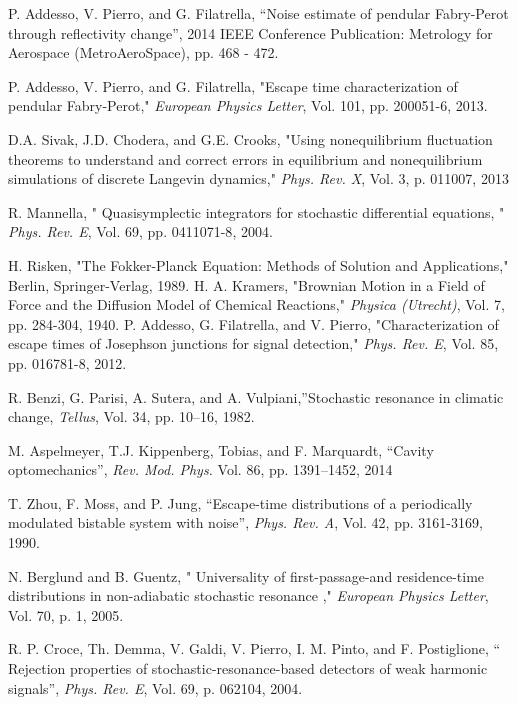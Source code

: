 \documentclass[conference]{IEEEtran}
\begin{document}
\begin{thebibliography}{99}
 P. Addesso, V. Pierro, and G. Filatrella, ``Noise estimate of pendular Fabry-Perot through reflectivity change'', 2014 IEEE Conference Publication: Metrology for Aerospace (MetroAeroSpace),  pp. 468 - 472.



P. Addesso, V. Pierro, and G. Filatrella, "Escape time characterization of pendular Fabry-Perot," {\it European Physics Letter}, {Vol. 101}, 
 pp. 200051-6, 2013. 
 
 D.A. Sivak, J.D. Chodera, and G.E.  Crooks, "Using nonequilibrium fluctuation theorems to understand and correct errors in equilibrium and 
nonequilibrium simulations of discrete Langevin dynamics," {\it Phys. Rev. X}, Vol. 3, p. 011007, 2013

 R. Mannella, " Quasisymplectic integrators for stochastic differential equations, "  
{\it Phys. Rev. E}, Vol. {69}, pp. {0411071-8}, {2004}.

 H. Risken, "The Fokker-Planck Equation: Methods of Solution and Applications," Berlin, Springer-Verlag, 1989.
  H. A. Kramers, "Brownian Motion in a Field of Force and the Diffusion 
Model of Chemical Reactions," {\it Physica (Utrecht)}, Vol. 7, pp. 284-304, 1940.
P. Addesso, G. Filatrella, and V. Pierro, "Characterization of escape times of Josephson junctions for signal detection," {\it Phys. Rev. E},
 {Vol. 85},  pp. 016781-8, 2012. 

 R. Benzi, G. Parisi, A. Sutera,  and A. Vulpiani,''Stochastic resonance in climatic change, {\it Tellus}, Vol. 34, pp. 10--16, 1982.

  M. Aspelmeyer, T.J.  Kippenberg, Tobias, and F. Marquardt, ``Cavity optomechanics'', {\it Rev. Mod. Phys. } Vol. 86, pp. 1391--1452, 2014


T. Zhou, F. Moss, and P. Jung, ``Escape-time distributions of a periodically modulated bistable system with noise'', {\it Phys. Rev. A}, Vol. 42, pp. 3161-3169, 1990.

  {N. Berglund and B. Guentz}, " Universality of first-passage-and residence-time distributions in non-adiabatic stochastic resonance ,"  
{\it European Physics Letter}, Vol. {70}, p. 1, {2005}.



R. P. Croce, Th. Demma, V. Galdi, V. Pierro, I. M. Pinto, and F. Postiglione, `` Rejection properties of stochastic-resonance-based detectors of weak harmonic signals'', {\it 
Phys. Rev. E}, Vol. 69, p. 062104, 2004.




\end{thebibliography}
\end{document}
